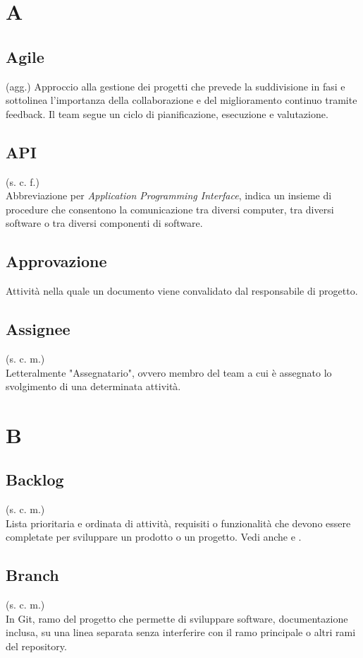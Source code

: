 \section{A}
    \subsection{Agile}
    (agg.)
    Approccio alla gestione dei progetti che prevede la suddivisione in fasi e sottolinea 
    l'importanza della collaborazione e del miglioramento continuo tramite feedback. 
    Il team segue un ciclo di pianificazione, esecuzione e valutazione.
    \subsection{API}
    (s. c. f.)\\
    Abbreviazione per \textit{Application Programming Interface}, indica un insieme di 
    procedure che consentono la comunicazione tra diversi computer, tra diversi 
    software o tra diversi componenti di software.
    \subsection{Approvazione}
    Attività nella quale un documento viene convalidato dal responsabile di progetto.
    \subsection{Assignee}
    (s. c. m.)\\
    Letteralmente "Assegnatario", ovvero membro del team a cui è assegnato lo
    svolgimento di una determinata attività.
\pagebreak
\section{B}
    \subsection{Backlog}
    (s. c. m.)\\
    Lista prioritaria e ordinata di attività, requisiti o funzionalità che devono 
    essere completate per sviluppare un prodotto o un progetto.
    Vedi anche  e .
    \subsection{Branch} 
    (s. c. m.)\\
    In Git, ramo del progetto che permette di sviluppare software, documentazione inclusa, su una linea separata 
    senza interferire con il ramo principale o altri rami del repository.
\pagebreak

